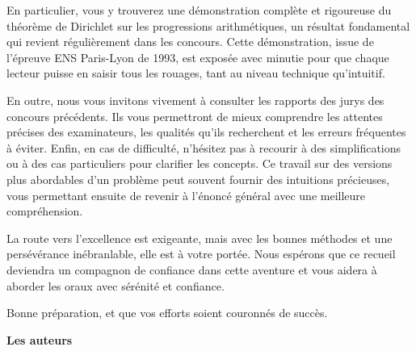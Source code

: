 En particulier, vous y trouverez une démonstration complète et rigoureuse du théorème de Dirichlet sur les progressions arithmétiques, un résultat fondamental qui revient régulièrement dans les concours. Cette démonstration, issue de l’épreuve ENS Paris-Lyon de 1993, est exposée avec minutie pour que chaque lecteur puisse en saisir tous les rouages, tant au niveau technique qu’intuitif.

En outre, nous vous invitons vivement à consulter les rapports des jurys des concours précédents. Ils vous permettront de mieux comprendre les attentes précises des examinateurs, les qualités qu’ils recherchent et les erreurs fréquentes à éviter. Enfin, en cas de difficulté, n’hésitez pas à recourir à des simplifications ou à des cas particuliers pour clarifier les concepts. Ce travail sur des versions plus abordables d’un problème peut souvent fournir des intuitions précieuses, vous permettant ensuite de revenir à l’énoncé général avec une meilleure compréhension.

La route vers l’excellence est exigeante, mais avec les bonnes méthodes et une persévérance inébranlable, elle est à votre portée. Nous espérons que ce recueil deviendra un compagnon de confiance dans cette aventure et vous aidera à aborder les oraux avec sérénité et confiance.

\bigskip

\noindent
Bonne préparation, et que vos efforts soient couronnés de succès.

\vspace{1cm}

\begin{flushright}
  \textbf{Les auteurs}
\end{flushright}
